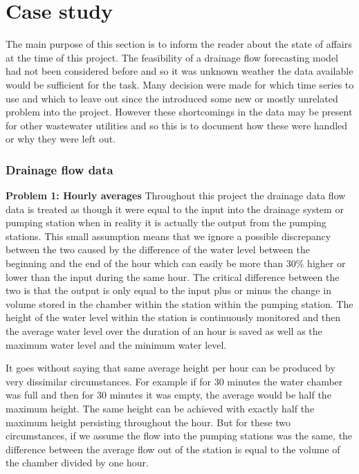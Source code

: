 \chapter{Case study} \label{sec:Case study}
The main purpose of this section is to inform the reader about the state of affairs at the time of this project. The feasibility of a drainage flow forecasting model had not been considered before and so it was unknown weather the data available would be sufficient for the task. Many decision were made for which time series to use and which to leave out since the introduced some new or mostly unrelated problem into the project. However these shortcomings in the data may be present for other wastewater utilities and so this is to document how these were handled or why they were left out. 

\subsection{Drainage flow data}
\textbf{Problem 1: Hourly averages}
Throughout this project the drainage data flow data is treated as though it were equal to the input into the drainage system or pumping station when in reality it is actually the output from the pumping stations. This small assumption means that we ignore a possible discrepancy between the two caused by the difference of the water level between the beginning and the end of the hour which can easily be more than 30\% higher or lower than the input during the same hour. The critical difference between the two is that the output is only equal to the input plus or minus the change in volume stored in the chamber within the station within the pumping station. The height of the water level within the station is continuously monitored and then the average water level over the duration of an hour is saved as well as the maximum water level and the minimum water level. 

It goes without saying that same average height per hour can be produced by very dissimilar circumstances. For example if for 30 minutes the water chamber was full and then for 30 minutes it was empty, the average would be half the maximum height. The same height can be achieved with exactly half the maximum height persisting throughout the hour. But for these two circumstances, if we assume the flow into the pumping stations was the same, the difference between the average flow out of the station is equal to the volume of the chamber divided by one hour. 

